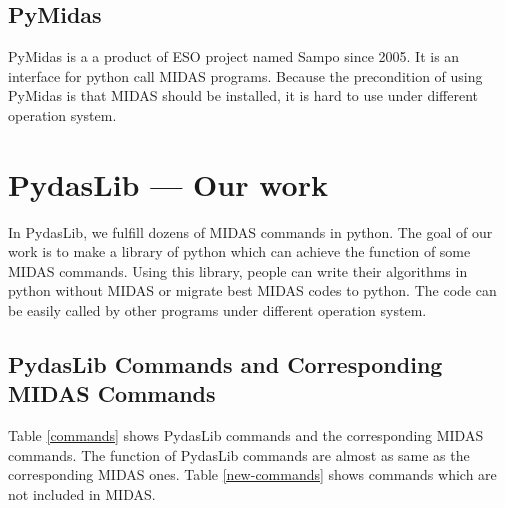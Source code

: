 \documentclass[11pt,twoside]{article}
\begin{document}
          \subsection{PyMidas}
PyMidas is a a product of ESO project named Sampo since 2005. It is 
an interface for python call MIDAS programs. Because the precondition of 
using PyMidas is that MIDAS should be installed, it is hard to use under
different operation system.

          \section{PydasLib --- Our work}
In PydasLib, we fulfill dozens of MIDAS commands in python. 
The goal of our work is to make a library of python which 
can achieve the function of some MIDAS commands. Using this library, people 
can write their algorithms in python without MIDAS or migrate best MIDAS
codes to python. The code can be easily 
called by other programs under different operation system. 

	  \subsection{PydasLib Commands and Corresponding MIDAS Commands}
Table \ref{commands} shows PydasLib commands and the corresponding MIDAS commands.
The function of PydasLib commands are almost as same as the corresponding MIDAS ones.
Table \ref{new-commands} shows commands which are not included in MIDAS. 
\end{document}
